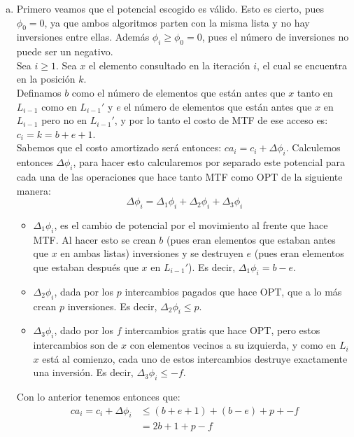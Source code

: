 \documentclass[dcc,uchile]{fcfmcourse}
\begin{document}
\begin{problems}
\begin{enumerate}[(a)]
    \item Primero veamos que el potencial escogido es válido. Esto es cierto, pues $\phi_{0} = 0$, ya que ambos algoritmos parten con la misma lista y no hay inversiones entre ellas. Además $\phi_{i} \ge \phi_{0} = 0$, pues el número de inversiones no puede ser un negativo.\\
    Sea $i\ge 1$. Sea $x$ el elemento consultado en la iteración $i$, el cual se encuentra en la posición $k$.\\
    Definamos $b$ como el número de elementos que están antes que $x$ tanto en $L_{i-1}$ como en $L_{i-1}'$ y $e$ el número de elementos que están antes que $x$ en $L_{i-1}$ pero no en $L_{i-1}'$, y por lo tanto el costo de MTF de ese acceso es: $c_{i} = k = b + e + 1$.\\
    Sabemos que el costo amortizado será entonces: $ca_{i} = c_{i} + \Delta \phi_{i}$. Calculemos entonces $\Delta \phi_{i}$, para hacer esto calcularemos por separado este potencial para cada una de las operaciones que hace tanto MTF como OPT de la siguiente manera:
    \begin{equation*}
        \Delta \phi_{i} = \Delta_1 \phi_{i} + \Delta_2 \phi_{i} + \Delta_3 \phi_{i}
    \end{equation*}
    \begin{itemize}
        \item $\Delta_1 \phi_{i}$, es el cambio de potencial por el movimiento al frente que hace MTF. Al hacer esto se crean $b$ (pues eran elementos que estaban antes que $x$ en ambas listas) inversiones y se destruyen $e$ (pues eran elementos que estaban después que $x$ en $L_{i-1}'$). Es decir, $\Delta_1 \phi_{i} = b - e$.
        \item $\Delta_2 \phi_{i}$, dada por los $p$ intercambios pagados que hace OPT, que a lo más crean $p$ inversiones. Es decir, $\Delta_2 \phi_{i} \le p$.
        \item $\Delta_3 \phi_{i}$, dado por los $f$ intercambios gratis que hace OPT, pero estos intercambios son de $x$ con elementos vecinos a su izquierda, y como en $L_{i}$ $x$ está al comienzo, cada uno de estos intercambios destruye exactamente una inversión. Es decir, $\Delta_3 \phi_{i} \le -f$.
    \end{itemize}
    Con lo anterior tenemos entonces que:
    \begin{align*}
        ca_{i} = c_{i} + \Delta \phi_{i} &\le (b + e + 1) + (b - e) + p + -f\\
        &=  2b + 1 + p - f\\

\end{align*}
\end{enumerate}
\end{problems}
\end{document}
